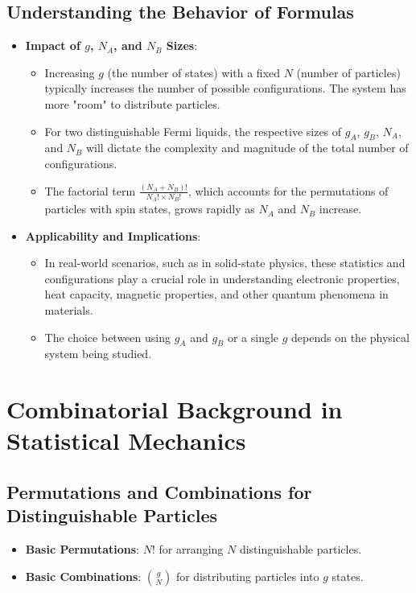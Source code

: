 \documentclass[12pt]{article}
\begin{document}
\subsection{Understanding the Behavior of Formulas}
\begin{itemize}
    \item \textbf{Impact of $g$, $N_A$, and $N_B$ Sizes}:
    \begin{itemize}
        \item Increasing $g$ (the number of states) with a fixed $N$ (number of particles) typically increases the number of possible configurations. The system has more "room" to distribute particles.
        \item For two distinguishable Fermi liquids, the respective sizes of $g_A$, $g_B$, $N_A$, and $N_B$ will dictate the complexity and magnitude of the total number of configurations.
        \item The factorial term $\frac{(N_A + N_B)!}{N_A! \times N_B!}$, which accounts for the permutations of particles with spin states, grows rapidly as $N_A$ and $N_B$ increase.
    \end{itemize}
    \item \textbf{Applicability and Implications}:
    \begin{itemize}
        \item In real-world scenarios, such as in solid-state physics, these statistics and configurations play a crucial role in understanding electronic properties, heat capacity, magnetic properties, and other quantum phenomena in materials.
        \item The choice between using $g_A$ and $g_B$ or a single $g$ depends on the physical system being studied.
    \end{itemize}
\end{itemize}

\section{Combinatorial Background in Statistical Mechanics}

\subsection{Permutations and Combinations for Distinguishable Particles}
\begin{itemize}
    \item \textbf{Basic Permutations}: $N!$ for arranging $N$ distinguishable particles.
    \item \textbf{Basic Combinations}: $\binom{g}{N}$ for distributing particles into $g$ states.
\end{itemize}
\end{document}
